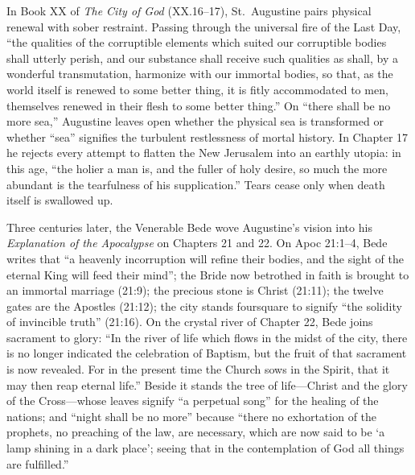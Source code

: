 In Book XX of \textit{The City of God} (XX.16--17), St.\ Augustine pairs physical renewal with sober restraint. Passing through the universal fire of the Last Day, ``the qualities of the corruptible elements which suited our corruptible bodies shall utterly perish, and our substance shall receive such qualities as shall, by a wonderful transmutation, harmonize with our immortal bodies, so that, as the world itself is renewed to some better thing, it is fitly accommodated to men, themselves renewed in their flesh to some better thing.'' On ``there shall be no more sea,'' Augustine leaves open whether the physical sea is transformed or whether ``sea'' signifies the turbulent restlessness of mortal history. In Chapter 17 he rejects every attempt to flatten the New Jerusalem into an earthly utopia: in this age, ``the holier a man is, and the fuller of holy desire, so much the more abundant is the tearfulness of his supplication.'' Tears cease only when death itself is swallowed up.

Three centuries later, the Venerable Bede wove Augustine's vision into his \textit{Explanation of the Apocalypse} on Chapters 21 and 22. On Apoc 21:1--4, Bede writes that ``a heavenly incorruption will refine their bodies, and the sight of the eternal King will feed their mind''; the Bride now betrothed in faith is brought to an immortal marriage (21:9); the precious stone is Christ (21:11); the twelve gates are the Apostles (21:12); the city stands foursquare to signify ``the solidity of invincible truth'' (21:16). On the crystal river of Chapter 22, Bede joins sacrament to glory: ``In the river of life which flows in the midst of the city, there is no longer indicated the celebration of Baptism, but the fruit of that sacrament is now revealed. For in the present time the Church sows in the Spirit, that it may then reap eternal life.'' Beside it stands the tree of life---Christ and the glory of the Cross---whose leaves signify ``a perpetual song'' for the healing of the nations; and ``night shall be no more'' because ``there no exhortation of the prophets, no preaching of the law, are necessary, which are now said to be `a lamp shining in a dark place'; seeing that in the contemplation of God all things are fulfilled.''

